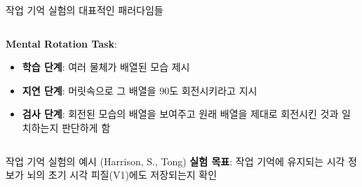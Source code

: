 \documentclass{beamer}
\begin{document}
\begin{frame}{작업 기억 실험의 대표적인 패러다임들}
\begin{columns}
\begin{column}{0.5\textwidth}
      \textbf{Mental Rotation Task}:\\
      \vspace{-0.5em}
      \begin{itemize}
        \small
        \item \textbf{학습 단계}: 여러 물체가 배열된 모습 제시
        \item \textbf{지연 단계}: 머릿속으로 그 배열을 90도 회전시키라고 지시
        \item \textbf{검사 단계}: 회전된 모습의 배열을 보여주고 원래 배열을 제대로 회전시킨 것과 일치하는지 판단하게 함
      \end{itemize}
    \end{column}
  \end{columns}
\end{frame}

\begin{frame}{작업 기억 실험의 예시 (Harrison, S., Tong)}
  \textbf{실험 목표}: 작업 기억에 유지되는 시각 정보가 뇌의 초기 시각 피질(V1)에도 저장되는지 확인\\~\\


\end{frame}
\end{document}
